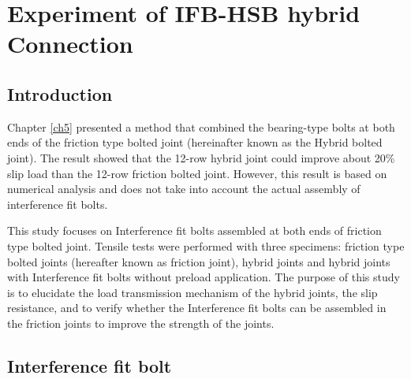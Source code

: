 \chapter{Experiment of IFB-HSB hybrid Connection}
\label{ch6}

\begin{spacing}{1.25} %
\minitoc %
\end{spacing} %
\onehalfspacing %

\section{Introduction}

Chapter \ref{ch5} presented a method that combined the bearing-type bolts at both ends of the friction type bolted joint (hereinafter known as the Hybrid bolted joint). The result showed that the 12-row hybrid joint could improve about 20\% slip load than the 12-row friction bolted joint. However, this result is based on numerical analysis and does not take into account the actual assembly of interference fit bolts.

This study focuses on Interference fit bolts assembled at both ends of friction type bolted joint. Tensile tests were performed with three specimens: friction type bolted joints (hereafter known as friction joint), hybrid joints and hybrid joints with Interference fit bolts without preload application. The purpose of this study is to elucidate the load transmission mechanism of the hybrid joints, the slip resistance, and to verify whether the Interference fit bolts can be assembled in the friction joints to improve the strength of the joints.


\section{Interference fit bolt}

